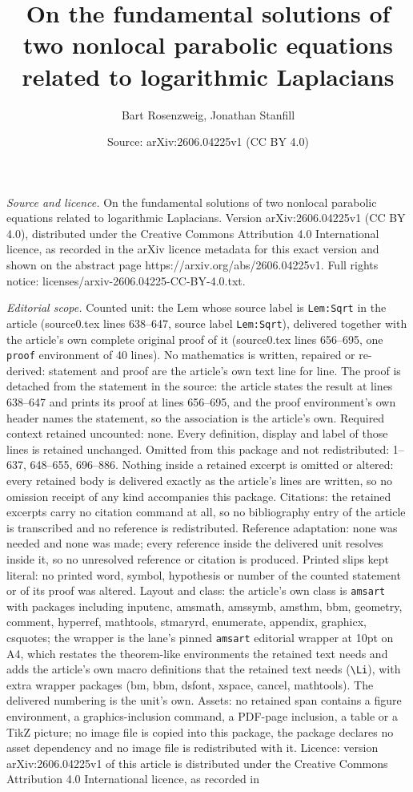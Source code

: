 \documentclass[10pt,a4paper]{amsart}
\title[On the fundamental solutions of two nonlocal parabolic equat]{On the fundamental solutions of two nonlocal parabolic equations related to logarithmic Laplacians}
\author{Bart Rosenzweig, Jonathan Stanfill}
\date{Source: arXiv:2606.04225v1 (CC BY 4.0)}
\begin{document}
\maketitle

\noindent\emph{Source and licence.} On the fundamental solutions of two nonlocal parabolic equations related to logarithmic Laplacians. Version arXiv:2606.04225v1 (CC BY 4.0), distributed under the Creative Commons Attribution 4.0 International licence, as recorded in the arXiv licence metadata for this exact version and shown on the abstract page https://arxiv.org/abs/2606.04225v1. Full rights notice: licenses/arxiv-2606.04225-CC-BY-4.0.txt.\par\smallskip

\noindent\textit{Editorial scope.} Counted unit: the Lem whose source label is \texttt{Lem:Sqrt} in the article (source0.tex lines 638--647, source label \texttt{Lem:Sqrt}), delivered together with the article's own complete original proof of it (source0.tex lines 656--695, one \texttt{proof} environment of 40 lines). No mathematics is written, repaired or re-derived: statement and proof are the article's own text line for line. The proof is detached from the statement in the source: the article states the result at lines 638--647 and prints its proof at lines 656--695, and the proof environment's own header names the statement, so the association is the article's own. Required context retained uncounted: none. Every definition, display and label of those lines is retained unchanged. Omitted from this package and not redistributed: 1--637, 648--655, 696--886. Nothing inside a retained excerpt is omitted or altered: every retained body is delivered exactly as the article's lines are written, so no omission receipt of any kind accompanies this package. Citations: the retained excerpts carry no citation command at all, so no bibliography entry of the article is transcribed and no reference is redistributed. Reference adaptation: none was needed and none was made; every reference inside the delivered unit resolves inside it, so no unresolved reference or citation is produced. Printed slips kept literal: no printed word, symbol, hypothesis or number of the counted statement or of its proof was altered. Layout and class: the article's own class is \texttt{amsart} with packages including inputenc, amsmath, amssymb, amsthm, bbm, geometry, comment, hyperref, mathtools, stmaryrd, enumerate, appendix, graphicx, csquotes; the wrapper is the lane's pinned \texttt{amsart} editorial wrapper at 10pt on A4, which restates the theorem-like environments the retained text needs and adds the article's own macro definitions that the retained text needs (\texttt{\textbackslash Li}), with extra wrapper packages (bm, bbm, dsfont, xspace, cancel, mathtools). The delivered numbering is the unit's own. Assets: no retained span contains a figure environment, a graphics-inclusion command, a PDF-page inclusion, a table or a TikZ picture; no image file is copied into this package, the package declares no asset dependency and no image file is redistributed with it. Licence: version arXiv:2606.04225v1 of this article is distributed under the Creative Commons Attribution 4.0 International licence, as recorded in 
\end{document}
